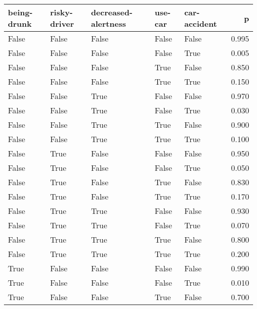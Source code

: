 \begin{tabular}{lllllr}
\toprule
 being-drunk &  risky-driver &  decreased-alertness &  use-car &  car-accident &     p \\
\midrule
       False &         False &                False &    False &         False & 0.995 \\
       False &         False &                False &    False &          True & 0.005 \\
       False &         False &                False &     True &         False & 0.850 \\
       False &         False &                False &     True &          True & 0.150 \\
       False &         False &                 True &    False &         False & 0.970 \\
       False &         False &                 True &    False &          True & 0.030 \\
       False &         False &                 True &     True &         False & 0.900 \\
       False &         False &                 True &     True &          True & 0.100 \\
       False &          True &                False &    False &         False & 0.950 \\
       False &          True &                False &    False &          True & 0.050 \\
       False &          True &                False &     True &         False & 0.830 \\
       False &          True &                False &     True &          True & 0.170 \\
       False &          True &                 True &    False &         False & 0.930 \\
       False &          True &                 True &    False &          True & 0.070 \\
       False &          True &                 True &     True &         False & 0.800 \\
       False &          True &                 True &     True &          True & 0.200 \\
        True &         False &                False &    False &         False & 0.990 \\
        True &         False &                False &    False &          True & 0.010 \\
        True &         False &                False &     True &         False & 0.700 \\

\end{tabular}
